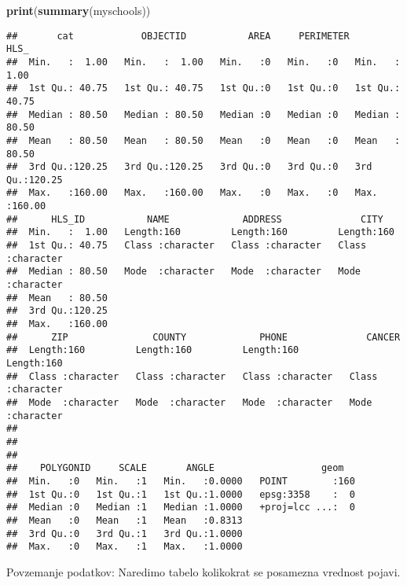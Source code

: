 \documentclass[]{article}
\newenvironment{Shaded}{\begin{snugshade}}{\end{snugshade}}
\newcommand{\KeywordTok}[1]{\textcolor[rgb]{0.13,0.29,0.53}{\textbf{#1}}}
\newcommand{\NormalTok}[1]{#1}
\begin{document}
\begin{Shaded}
\begin{Highlighting}[]
\KeywordTok{print}\NormalTok{(}\KeywordTok{summary}\NormalTok{(myschools))}
\end{Highlighting}
\end{Shaded}

\begin{verbatim}
##       cat            OBJECTID           AREA     PERIMETER      HLS_       
##  Min.   :  1.00   Min.   :  1.00   Min.   :0   Min.   :0   Min.   :  1.00  
##  1st Qu.: 40.75   1st Qu.: 40.75   1st Qu.:0   1st Qu.:0   1st Qu.: 40.75  
##  Median : 80.50   Median : 80.50   Median :0   Median :0   Median : 80.50  
##  Mean   : 80.50   Mean   : 80.50   Mean   :0   Mean   :0   Mean   : 80.50  
##  3rd Qu.:120.25   3rd Qu.:120.25   3rd Qu.:0   3rd Qu.:0   3rd Qu.:120.25  
##  Max.   :160.00   Max.   :160.00   Max.   :0   Max.   :0   Max.   :160.00  
##      HLS_ID           NAME             ADDRESS              CITY          
##  Min.   :  1.00   Length:160         Length:160         Length:160        
##  1st Qu.: 40.75   Class :character   Class :character   Class :character  
##  Median : 80.50   Mode  :character   Mode  :character   Mode  :character  
##  Mean   : 80.50                                                           
##  3rd Qu.:120.25                                                           
##  Max.   :160.00                                                           
##      ZIP               COUNTY             PHONE              CANCER         
##  Length:160         Length:160         Length:160         Length:160        
##  Class :character   Class :character   Class :character   Class :character  
##  Mode  :character   Mode  :character   Mode  :character   Mode  :character  
##                                                                             
##                                                                             
##                                                                             
##    POLYGONID     SCALE       ANGLE                   geom    
##  Min.   :0   Min.   :1   Min.   :0.0000   POINT        :160  
##  1st Qu.:0   1st Qu.:1   1st Qu.:1.0000   epsg:3358    :  0  
##  Median :0   Median :1   Median :1.0000   +proj=lcc ...:  0  
##  Mean   :0   Mean   :1   Mean   :0.8313                      
##  3rd Qu.:0   3rd Qu.:1   3rd Qu.:1.0000                      
##  Max.   :0   Max.   :1   Max.   :1.0000
\end{verbatim}

Povzemanje podatkov: Naredimo tabelo kolikokrat se posamezna vrednost
pojavi.
\end{document}
